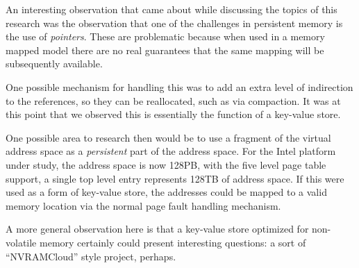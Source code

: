 An interesting observation that came about while discussing
the topics of this research was the observation that one of
the challenges in persistent memory is the use of 
\textit{pointers}.  These are problematic because when used in
a memory mapped model there are no real guarantees that the
same mapping will be subsequently available.

One possible mechanism for handling this was to add an extra
level of indirection to the references, so they can be 
reallocated, such as via compaction.  It was at this point that 
we observed this is essentially the function of a key-value
store.

One possible area to research then would be to use a fragment of the virtual address space as a \textit{persistent} part of the address space.  For the Intel platform under study, the address
space is now 128PB, with the five level page table support, a single top level entry represents 128TB of address space.  If this were used as a form of key-value store, the addresses could be mapped to a valid memory location via the normal page fault handling mechanism.

A more general observation here is that a key-value store
optimized for non-volatile memory certainly could present
interesting questions: a sort of ``NVRAMCloud'' style project, perhaps.


